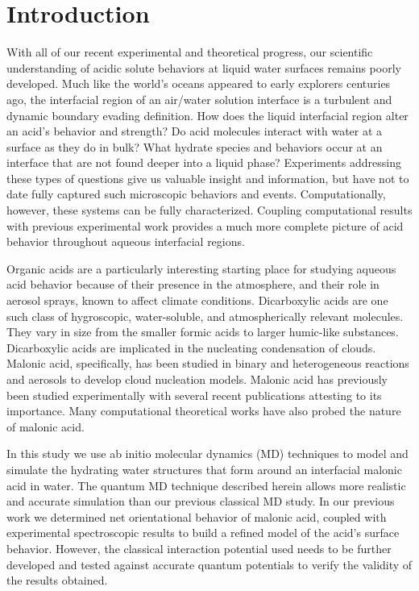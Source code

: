 \section {Introduction}

With all of our recent experimental and theoretical progress, our scientific understanding of acidic solute behaviors at liquid water surfaces remains poorly developed. Much like the world's oceans appeared to early explorers centuries ago, the interfacial region of an air/water solution interface is a turbulent and dynamic boundary evading definition. How does the liquid interfacial region alter an acid's behavior and strength? Do acid molecules interact with water at a surface as they do in bulk? What hydrate species and behaviors occur at an interface that are not found deeper into a liquid phase? Experiments addressing these types of questions give us valuable insight and information, but have not to date fully captured such microscopic behaviors and events. Computationally, however, these systems can be fully characterized. Coupling computational results with previous experimental work provides a much more complete picture of acid behavior throughout aqueous interfacial regions.

Organic acids are a particularly interesting starting place for studying aqueous acid behavior because of their presence in the atmosphere,\cite{Kanakidou2005} and their role in aerosol sprays, known to affect climate conditions.\cite{Finlayson-Pitts2000,Seinfeld1998} Dicarboxylic acids are one such class of hygroscopic, water-soluble, and atmospherically relevant molecules.\cite{Peng2001,Kawamura1993,Kawamura1996,Kawamura1999,Senpere1994,Senpere1996,Aggarwal2008,Hsieh2007,Hsieh2009,Pavuluri2010} They vary in size from the smaller formic acids to larger humic-like substances.\cite{Chebbi1996,Badger2005} Dicarboxylic acids are implicated in the nucleating condensation of clouds.\cite{Cruz1997} Malonic acid, specifically, has been studied in binary and heterogeneous reactions and aerosols to develop cloud nucleation models.\cite{Giebl2002,Finlayson-Pitts2009} Malonic acid has previously been studied experimentally with several recent publications attesting to its importance.\cite{Parsons2004,Braban2003,Hansen2004,Hyvarinen2006,Riipinen2007} Many computational theoretical works have also probed the nature of malonic acid.\cite{Nguyen2005,Merchan1984,MoreReferences}

In this study we use ab initio molecular dynamics (MD) techniques to model and simulate the hydrating water structures that form around an interfacial malonic acid in water. The quantum MD technique described herein allows more realistic and accurate simulation than our previous classical MD study.\cite{Blower2012} In our previous work we determined net orientational behavior of malonic acid, coupled with experimental spectroscopic results to build a refined model of the acid's surface behavior. However, the classical interaction potential used needs to be further developed and tested against accurate quantum potentials to verify the validity of the results obtained.

